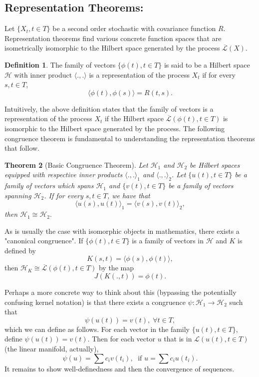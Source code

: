 \documentclass{article}
\newtheorem{thm}{Theorem}[section]
\theoremstyle{definition}
\newtheorem{defn}[thm]{Definition}
\theoremstyle{remark}
\numberwithin{equation}{section}
\begin{document}
\subsection{Representation Theorems:}
Let $\{ X_t, t \in T \}$ be a second order stochastic with covariance function $R$. Representation theorems find various concrete function spaces that are isometrically isomorphic to the Hilbert space generated by the process $\overline{\mathcal{L}}(X).$ 

\begin{defn}
The family of vectors $\{ \phi (t), t \in T \}$ is said to be a Hilbert space $\mathcal{H}$ with inner product $\langle . , . \rangle$ is a representation of the process $X_t$ if for every $s, t \in T$, 
$$\langle \phi (t) , \phi (s) \rangle = R(t, s). $$
\end{defn}

Intuitively, the above definition states that the family of vectors is a representation of the process $X_t$ if the Hilbert space $\overline{\mathcal{L}} (\phi (t), t \in T )$ is isomorphic to the Hilbert space generated by the process. The following congruence theorem is fundamental to understanding the representation theorems that follow. 

\begin{thm} [Basic Congruence Theorem]
Let $\mathcal{H} _1$ and $\mathcal{H} _2$ be Hilbert spaces equipped with respective inner products $\langle ., . \rangle _1$ and $\langle ., . \rangle _2$. Let $\{ u (t), t \in T \}$ be a family of vectors which spans $\mathcal{H} _1$ and $\{ v(t) , t \in T \}$ be a family of vectors spanning $\mathcal{H}_2$. If for every $s, t \in T$, we have that 
$$\langle u(s), u(t) \rangle _1 = \langle v(s), v(t) \rangle _2, $$
then $\mathcal{H}_1 \cong \mathcal{H}_2.$ 
\end{thm}

As is usually the case with isomorphic objects in mathematics, there exists a "canonical congruence". If $\{ \phi (t), t \in T \}$ is a family of vectors in $\mathcal{H}$ and $K$ is defined by 
$$K(s, t) = \langle \phi (s), \phi (t) \rangle, $$
then $\mathcal{H} _K \cong \overline{\mathcal{L}}(\phi (t), t \in T)$ by the map 
$$J(K(., t)) = \phi (t). $$

Perhaps a more concrete way to think about this (bypassing the potentially confusing kernel notation) is that there exists a congruence $\psi : \mathcal{H} _1 \rightarrow \mathcal{H} _2$ such that 
$$\psi (u(t)) = v(t), \; \forall t \in T, $$
which we can define as follows. For each vector in the family $\{ u(t), t \in T \}$, define $\psi (u(t)) = v(t).$ Then for each vector $u$ that is in $\mathcal{L} (u(t), t \in T)$ (the linear manifold, actually), 
$$\psi (u) = \sum c_i v(t_i), \; \text{ if } u = \sum c_i u(t_i). $$
It remains to show well-definedness and then the convergence of sequences. 
\end{document}

